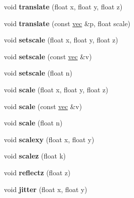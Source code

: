 \begin{DoxyCompactItemize}
void {\bfseries translate} (float x, float y, float z)
\item 
\mbox{\label{structmatrix4_a28947cc9b90aff5b4eb6915e1a49a98f}} 
void {\bfseries translate} (const \hyperlink{structvec}{vec} \&p, float scale)
\item 
\mbox{\label{structmatrix4_a49e912ec31f21d4417d43ad9594ae091}} 
void {\bfseries setscale} (float x, float y, float z)
\item 
\mbox{\label{structmatrix4_a1185144bde1f3a49d650f8af9b12bfe4}} 
void {\bfseries setscale} (const \hyperlink{structvec}{vec} \&v)
\item 
\mbox{\label{structmatrix4_a62223ae35fcbeba5eb6c9665a17fac70}} 
void {\bfseries setscale} (float n)
\item 
\mbox{\label{structmatrix4_a39e95260b516528a702f34d7f5d0cd55}} 
void {\bfseries scale} (float x, float y, float z)
\item 
\mbox{\label{structmatrix4_afe442107cf120751b2387fd3d98a0632}} 
void {\bfseries scale} (const \hyperlink{structvec}{vec} \&v)
\item 
\mbox{\label{structmatrix4_a2e10df0dd557fc1c29c856feb5261ba3}} 
void {\bfseries scale} (float n)
\item 
\mbox{\label{structmatrix4_a404ed5a5f9f751067cf68c2809fa87ba}} 
void {\bfseries scalexy} (float x, float y)
\item 
\mbox{\label{structmatrix4_a08a8effdc4abc198e1558b6c1440446a}} 
void {\bfseries scalez} (float k)
\item 
\mbox{\label{structmatrix4_aa88aea9c56d82a452557d974128395ba}} 
void {\bfseries reflectz} (float z)
\item 
\mbox{\label{structmatrix4_a217e84021d46952ee22c7ab3388e824e}} 
void {\bfseries jitter} (float x, float y)
\item 
\mbox{\label{structmatrix4_a3149cea5649dabf36554b2dacf3c502f}} 

\end{DoxyCompactItemize}
